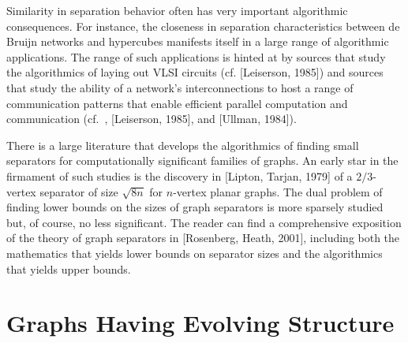\smallskip

Similarity in separation behavior often has very important algorithmic consequences.  For instance, the closeness in separation characteristics between de Bruijn networks and hypercubes manifests itself in a large range of algorithmic applications.  The range of such applications is hinted at by sources that study the algorithmics of laying out VLSI circuits (cf. [Leiserson, 1985]) and sources that study the ability of a network's interconnections to host a range of communication patterns that enable efficient parallel computation and communication (cf.~\cite{AnnexsteinBR90}, [Leiserson, 1985], and [Ullman, 1984]).

\medskip

There is a large literature that develops the algorithmics of finding small separators for computationally significant families of graphs.  An early star in the firmament of such studies is the discovery in [Lipton, Tarjan, 1979] of a $2/3$-vertex separator of size $\sqrt{8n}$ for $n$-vertex planar graphs.  The dual problem of finding lower bounds on the sizes of graph separators is more sparsely studied but, of course, no less significant.  The reader can find a comprehensive exposition of the theory of graph separators in [Rosenberg, Heath, 2001], including both the mathematics that yields lower bounds on separator sizes and the algorithmics that yields upper bounds.


\section{Graphs Having Evolving Structure}
\label{sec:graph-evolve}


